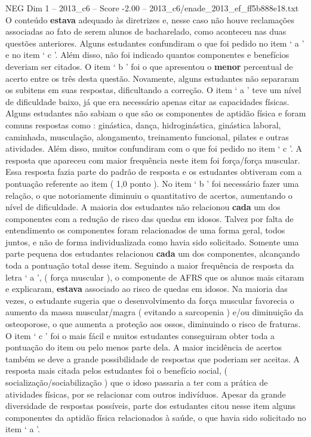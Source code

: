 \begin{textsample}{NEG Dim 1 – 2013\_c6 – Score -2.00 – 2013\_c6/enade\_2013\_ef\_ff5b888e18.txt}
O conteúdo \textbf{estava} adequado às diretrizes e, nesse caso não houve reclamações associadas ao fato de serem alunos de bacharelado, como aconteceu nas duas questões anteriores.
Alguns estudantes confundiram o que foi pedido no item ‘ a ’ e no item ‘ c ’.
Além disso, não foi indicado quantos componentes e benefícios deveriam ser citados.
O item ‘ b ’ foi o que apresentou o \textbf{menor} percentual de acerto entre os três desta questão.
Novamente, alguns estudantes não separaram os subitens em suas respostas, dificultando a correção.
O item ‘ a ’ teve um nível de dificuldade baixo, já que era necessário apenas citar as capacidades físicas.
Alguns estudantes não sabiam o que são os componentes de aptidão física e foram comuns respostas como : ginástica, dança, hidroginástica, ginástica laboral, caminhada, musculação, alongamento, treinamento funcional, pilates e outras atividades.
Além disso, muitos confundiram com o que foi pedido no item ‘ c ’.
A resposta que apareceu com maior frequência neste item foi força/força muscular.
Essa resposta fazia parte do padrão de resposta e os estudantes obtiveram com a pontuação referente ao item ( 1,0 ponto ).
No item ‘ b ’ foi necessário fazer uma relação, o que notoriamente diminuiu o quantitativo de acertos, aumentando o nível de dificuldade.
A maioria dos estudantes não relacionou \textbf{cada} um dos componentes com a redução de risco das quedas em idosos.
Talvez por falta de entendimento os componentes foram relacionados de uma forma geral, todos juntos, e não de forma individualizada como havia sido solicitado.
Somente uma parte pequena dos estudantes relacionou \textbf{cada} um dos componentes, alcançando toda a pontuação total desse item.
Seguindo a maior frequência de resposta da letra ‘ a ’, ( força muscular ), o componente de AFRS que os alunos mais citaram e explicaram, \textbf{estava} associado ao risco de quedas em idosos.
Na maioria das vezes, o estudante sugeria que o desenvolvimento da força muscular favorecia o aumento da massa muscular/magra ( evitando a sarcopenia ) e/ou diminuição da osteoporose, o que aumenta a proteção aos ossos, diminuindo o risco de fraturas.
O item ‘ c ’ foi o mais fácil e muitos estudantes conseguiram obter toda a pontuação do item ou pelo menos parte dela.
A maior incidência de acertos também se deve a grande possibilidade de respostas que poderiam ser aceitas.
A resposta mais citada pelos estudantes foi o benefício social, ( socialização/sociabilização ) que o idoso passaria a ter com a prática de atividades físicas, por se relacionar com outros indivíduos.
Apesar da grande diversidade de respostas possíveis, parte dos estudantes citou nesse item alguns componentes da aptidão física relacionados à saúde, o que havia sido solicitado no item ‘ a ’.

\end{textsample}
